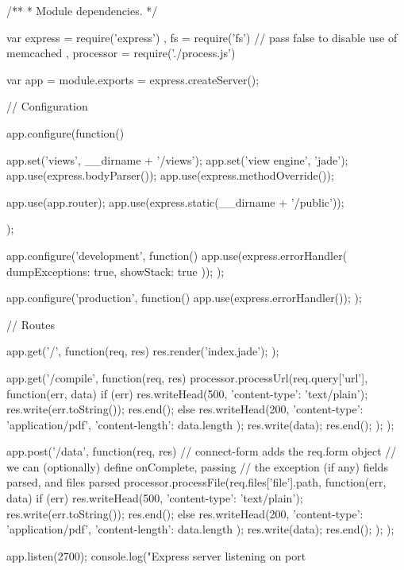 
/**
 * Module dependencies.
 */

var express = require('express')
  , fs = require('fs')
  // pass false to disable use of memcached
  , processor = require('./process.js')

var app = module.exports = express.createServer();

// Configuration

app.configure(function(){
  app.set('views', __dirname + '/views');
  app.set('view engine', 'jade');
  app.use(express.bodyParser());
  app.use(express.methodOverride());

  app.use(app.router);
  app.use(express.static(__dirname + '/public'));
});

app.configure('development', function(){
  app.use(express.errorHandler({ dumpExceptions: true, showStack: true }));
});

app.configure('production', function(){
  app.use(express.errorHandler());
});

// Routes

app.get('/', function(req, res) {
    res.render('index.jade');
});

app.get('/compile', function(req, res) {
    processor.processUrl(req.query['url'], function(err, data) {
        if (err) {
            res.writeHead(500, {'content-type': 'text/plain'});
            res.write(err.toString());
            res.end();
        } else {
            res.writeHead(200, {
                'content-type': 'application/pdf',
                'content-length': data.length
            });
            res.write(data);
            res.end();
        }
    });
});

app.post('/data', function(req, res) {
     // connect-form adds the req.form object
  // we can (optionally) define onComplete, passing
  // the exception (if any) fields parsed, and files parsed
    processor.processFile(req.files['file'].path, function(err, data) {
        if (err) {
            res.writeHead(500, {'content-type': 'text/plain'});
            res.write(err.toString());
            res.end();
        } else {
            res.writeHead(200, {
                'content-type': 'application/pdf',
                'content-length': data.length
            });
            res.write(data);
            res.end();
        }
    });
});


app.listen(2700);
console.log("Express server listening on port %

